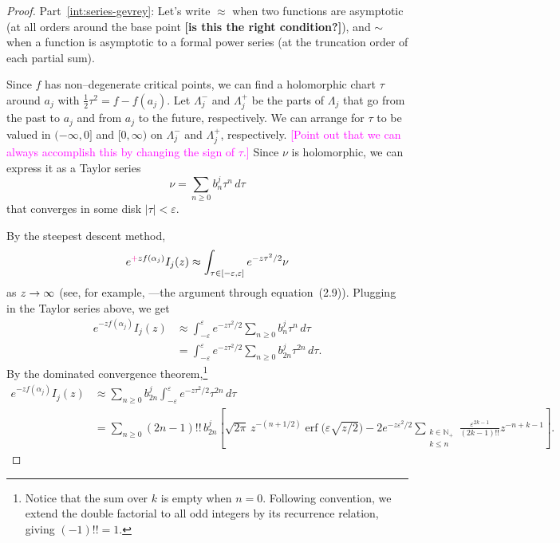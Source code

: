 \documentclass{article}
\let\Re\relax
\DeclareMathOperator{\Re}{Re}
\theoremstyle{definition}
\begin{document}
\begin{proof}

Part~\eqref{int:series-gevrey}: Let's write $\approx$ when two functions are asymptotic (at all orders around the base point \textbf{[is this the right condition?]}), and $\sim$ when a function is asymptotic to a formal power series (at the truncation order of each partial sum).

Since $f$ has non--degenerate critical points, we can find a holomorphic chart $\tau$ around $a_j$ with $\tfrac{1}{2} \tau^2 = f - f(a_j)$. Let $\Lambda^-_j$ and $\Lambda^+_j$ be the parts of $\Lambda_j$ that go from the past to $a_j$ and from $a_j$ to the future, respectively. We can arrange for $\tau$ to be valued in $(-\infty, 0]$ and $[0, \infty)$ on $\Lambda^-_j$ and $\Lambda^+_j$, respectively. \textcolor{magenta}{[Point out that we can always accomplish this by changing the sign of $\tau$.]} Since $\nu$ is holomorphic, we can express it as a Taylor series
\[ \nu = \sum_{n \ge 0} b_n^j \tau^n\,d\tau \]
that converges in some disk $|\tau| < \varepsilon$.

By the steepest descent method,
\[ e^{\textcolor{magenta}{+}z f(\alpha_j)} I_j(z) \approx \int_{\tau \in [-\varepsilon, \varepsilon]} e^{-z\tau^2/2} \nu \]
as $\Re z \to \infty$ (see, for example, \cite[Proposition 2.1]{miller2006applied}---the argument through equation~(2.9)). Plugging in the Taylor series above, we get
\begin{align*}
e^{-z f(\alpha_j)} I_j(z) & \approx \int_{-\varepsilon}^\varepsilon e^{-z\tau^2/2} \sum_{n \ge 0} b_n^j \tau^n\,d\tau \\
& = \int_{-\varepsilon}^\varepsilon e^{-z\tau^2/2} \sum_{n \ge 0} b_{2n}^j \tau^{2n}\,d\tau.
\end{align*}
By the dominated convergence theorem,\footnote{Notice that the sum over $k$ is empty when $n = 0$. Following convention, we extend the double factorial to all odd integers by its recurrence relation, giving $(-1)!! = 1$.}
\begin{align*}
e^{-z f(\alpha_j)} I_j(z) & \approx \sum_{n \ge 0} b_{2n}^j \int_{-\varepsilon}^\varepsilon e^{-z\tau^2/2} \tau^{2n}\,d\tau \\
& = \sum_{n \ge 0} (2n-1)!!\,b_{2n}^j \left[ \sqrt{2\pi}\,z^{-(n+1/2)} \operatorname{erf}\big(\varepsilon \sqrt{z/2}\big) - 2e^{-z\varepsilon^2/2} \sum_{\substack{k \in \mathbb{N}_+ \\ k \le n}} \frac{\varepsilon^{2k-1}}{(2k-1)!!} z^{-n+k-1} \right].
\end{align*}


\end{proof}
\end{document}
